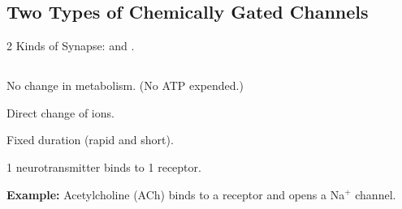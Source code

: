 \subsection{Two Types of Chemically Gated Channels}

2 Kinds of Synapse:  and . 

\subsection{}

\begin{coloredlist}
    \item No change in metabolism. (No ATP expended.)
    \item Direct change of ions.
    \item Fixed duration (rapid and short).
    \item 1 neurotransmitter binds to 1 receptor.
    \item \textbf{Example:} Acetylcholine (ACh) binds to a receptor and opens a Na\(^+\) channel.
\end{coloredlist}

\subsection{}

